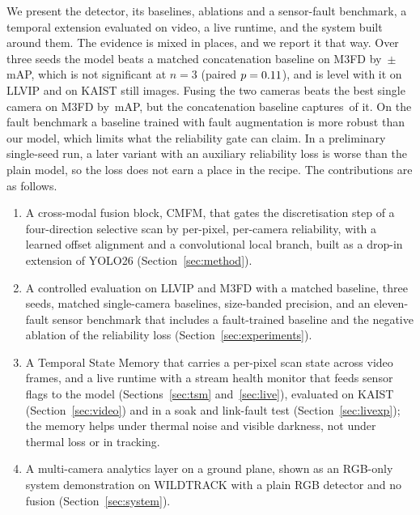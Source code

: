 We present the detector, its baselines, ablations and a sensor-fault benchmark, a temporal extension evaluated on video, a live runtime, and the system built around them. The evidence is mixed in places, and we report it that way. Over three seeds the model beats a matched concatenation baseline on M3FD by \marMfdVtwoVsConcatMdMeanMap{}\,$\pm$\,\marMfdVtwoVsConcatMdStdMap{} mAP, which is not significant at $n=3$ (paired $p=0.11{}$), and is level with it on LLVIP and on KAIST still images. Fusing the two cameras beats the best single camera on M3FD by \gainMfdCffmVtwoOverBestMeanMap{}\,mAP, but the concatenation baseline captures \gainMfdConcatMdOverBestMeanMap{}\,of it. On the fault benchmark a baseline trained with fault augmentation is more robust than our model, which limits what the reliability gate can claim. In a preliminary single-seed run, a later variant with an auxiliary reliability loss is worse than the plain model, so the loss does not earn a place in the recipe. The contributions are as follows.
\begin{enumerate}
\item A cross-modal fusion block, CMFM, that gates the discretisation step of a four-direction selective scan by per-pixel, per-camera reliability, with a learned offset alignment and a convolutional local branch, built as a drop-in extension of YOLO26 (Section~\ref{sec:method}).
\item A controlled evaluation on LLVIP and M3FD with a matched baseline, three seeds, matched single-camera baselines, size-banded precision, and an eleven-fault sensor benchmark that includes a fault-trained baseline and the negative ablation of the reliability loss (Section~\ref{sec:experiments}).
\item A Temporal State Memory that carries a per-pixel scan state across video frames, and a live runtime with a stream health monitor that feeds sensor flags to the model (Sections~\ref{sec:tsm} and~\ref{sec:live}), evaluated on KAIST (Section~\ref{sec:video}) and in a soak and link-fault test (Section~\ref{sec:livexp}); the memory helps under thermal noise and visible darkness, not under thermal loss or in tracking.
\item A multi-camera analytics layer on a ground plane, shown as an RGB-only system demonstration on WILDTRACK with a plain RGB detector and no fusion (Section~\ref{sec:system}).
\end{enumerate}

